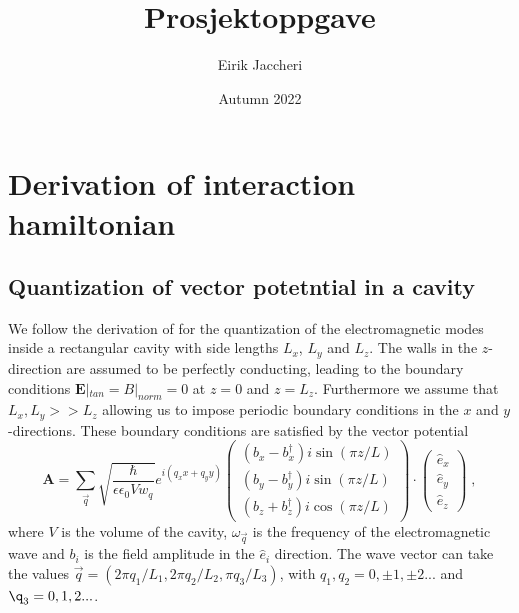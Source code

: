 \documentclass{article}
\title{Prosjektoppgave}
\author{Eirik Jaccheri}
\date{Autumn 2022}
\begin{document}
\maketitle

\section{Derivation of interaction hamiltonian}

\subsection{Quantization of vector potetntial in a cavity}
We follow the derivation of \cite{QuantizationEMCavities} for the quantization of the electromagnetic modes inside a rectangular cavity with side lengths $L_x$, $L_y$ and $L_z$. The walls in the $z$-direction are assumed to be perfectly conducting, leading to the boundary conditions $\textbf{E}|_{tan} = B|_{norm} = 0$ at $z=0$ and $z = L_z$. Furthermore we assume that $L_x, L_y >> L_z$ allowing us to impose periodic boundary conditions in the $x$ and $y$-directions. These boundary conditions are satisfied by the vector potential
\begin{equation}
    \textbf{A} = \sum_{\vec{q}} \sqrt{\frac{\hbar}{\epsilon \epsilon_0 V w_q}} e^{i(q_x x + q_y y)} \begin{pmatrix}\left(b_x - b_x^{\dagger}\right)i\sin(\pi z / L)\\\left(b_y - b_y^{\dagger}\right)i\sin(\pi z / L)\\\left(b_z + b_z^{\dagger}\right)i\cos(\pi z / L)\end{pmatrix} \cdot \begin{pmatrix} \hat{e}_x \\ \hat{e}_y  \\  \hat{e}_z   \end{pmatrix} \;,
    \label{classical vector potential}
\end{equation}
where $V$ is the volume of the cavity, $\omega_{\vec{q}}$ is the frequency of the electromagnetic wave and $b_i$ is the field amplitude in the $\hat{e}_i$ direction. The wave vector can take the values $\vec{q} = (2\pi q_1 / L_1, 2\pi q_2 / L_2, \pi q_3 / L_3 )$, with $q_1, q_2 = 0, \pm 1, \pm 2...$ and $\q_3 = 0, 1, 2...$.
\end{document}
